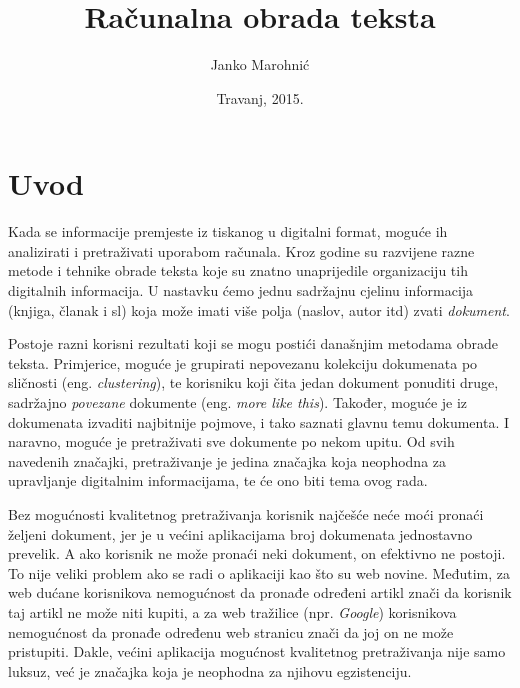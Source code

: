 \documentclass[a4paper,twoside,12pt]{scrreprt}
\title{Računalna obrada teksta}
\author{Janko Marohnić}
\date{Travanj, 2015.}
\begin{document}
\frontmatter

\chapter{Uvod}

Kada se informacije premjeste iz tiskanog u digitalni format, moguće ih analizirati i pretraživati uporabom računala. Kroz godine su razvijene razne metode i tehnike obrade teksta koje su znatno unaprijedile organizaciju tih digitalnih informacija. U nastavku ćemo jednu sadržajnu cjelinu informacija (knjiga, članak i sl) koja može imati više polja (naslov, autor itd) zvati \textit{dokument}.

Postoje razni korisni rezultati koji se mogu postići današnjim metodama obrade teksta. Primjerice, moguće je grupirati nepovezanu kolekciju dokumenata po sličnosti (eng. \textit{clustering}), te korisniku koji čita jedan dokument ponuditi druge, sadržajno \textit{povezane} dokumente (eng. \textit{more like this}). Također, moguće je iz dokumenata izvaditi najbitnije pojmove, i tako saznati glavnu temu dokumenta. I naravno, moguće je pretraživati sve dokumente po nekom upitu. Od svih navedenih značajki, pretraživanje je jedina značajka koja neophodna za upravljanje digitalnim informacijama, te će ono biti tema ovog rada.

Bez mogućnosti kvalitetnog pretraživanja korisnik najčešće neće moći pronaći željeni dokument, jer je u većini aplikacijama broj dokumenata jednostavno prevelik. A ako korisnik ne može pronaći neki dokument, on efektivno ne postoji. To nije veliki problem ako se radi o aplikaciji kao što su web novine. Međutim, za web dućane korisnikova nemogućnost da pronađe određeni artikl znači da korisnik taj artikl ne može niti kupiti, a za web tražilice (npr. \textit{Google}) korisnikova nemogućnost da pronađe određenu web stranicu znači da joj on ne može pristupiti. Dakle, većini aplikacija mogućnost kvalitetnog pretraživanja nije samo luksuz, već je značajka koja je neophodna za njihovu egzistenciju.
\end{document}
